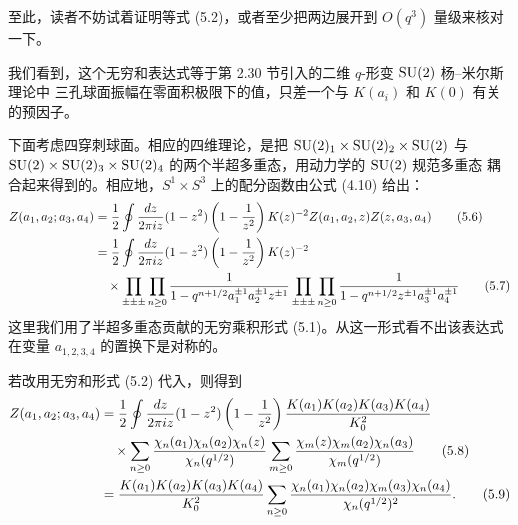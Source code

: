 
至此，读者不妨试着证明等式 (5.2)，或者至少把两边展开到 $O(q^3)$ 量级来核对一下。

我们看到，这个无穷和表达式等于第 2.30 节引入的二维 $q$-形变 $\mathrm{SU}(2)$ 杨--米尔斯理论中
三孔球面振幅在零面积极限下的值，只差一个与 $K(a_i)$ 和 $K(0)$ 有关的预因子。

下面考虑四穿刺球面。相应的四维理论，是把 $\mathrm{SU}(2)_1\times\mathrm{SU}(2)_2\times\mathrm{SU}(2)$ 与
$\mathrm{SU}(2)\times\mathrm{SU}(2)_3\times\mathrm{SU}(2)_4$ 的两个半超多重态，用动力学的 $\mathrm{SU}(2)$ 规范多重态
耦合起来得到的。相应地，$S^1\times S^3$ 上的配分函数由公式 (4.10) 给出：
\begin{align}
Z(a_1,a_2;a_3,a_4)&=\frac{1}{2}\oint\frac{dz}{2\pi iz}(1-z^2)\left(1-\frac{1}{z^2}\right)
K(z)^{-2}Z(a_1,a_2,z)Z(z,a_3,a_4)
\tag{5.6}\\
&=\frac{1}{2}\oint\frac{dz}{2\pi iz}(1-z^2)\left(1-\frac{1}{z^2}\right)K(z)^{-2}\notag\\
&\quad\times\prod_{\pm\pm\pm}\prod_{n\ge0}\frac{1}{1-q^{n+1/2}a_1^{\pm1}a_2^{\pm1}z^{\pm1}}
\prod_{\pm\pm\pm}\prod_{n\ge0}\frac{1}{1-q^{n+1/2}z^{\pm1}a_3^{\pm1}a_4^{\pm1}}
\tag{5.7}
\end{align}
这里我们用了半超多重态贡献的无穷乘积形式 (5.1)。从这一形式看不出该表达式在变量
$a_{1,2,3,4}$ 的置换下是对称的。


若改用无穷和形式 (5.2) 代入，则得到
\begin{align}
Z(a_1,a_2;a_3,a_4)&=\frac{1}{2}\oint\frac{dz}{2\pi iz}(1-z^2)\left(1-\frac{1}{z^2}\right)
\frac{K(a_1)K(a_2)K(a_3)K(a_4)}{K_0^2}\notag\\
&\quad\times\sum_{n\ge0}\frac{\chi_n(a_1)\chi_n(a_2)\chi_n(z)}{\chi_n(q^{1/2})}
\sum_{m\ge0}\frac{\chi_m(z)\chi_m(a_2)\chi_n(a_3)}{\chi_m(q^{1/2})}
\tag{5.8}\\
&=\frac{K(a_1)K(a_2)K(a_3)K(a_4)}{K_0^2}\sum_{n\ge0}
\frac{\chi_n(a_1)\chi_n(a_2)\chi_m(a_3)\chi_n(a_4)}{\chi_n(q^{1/2})^2}.
\tag{5.9}
\end{align}

